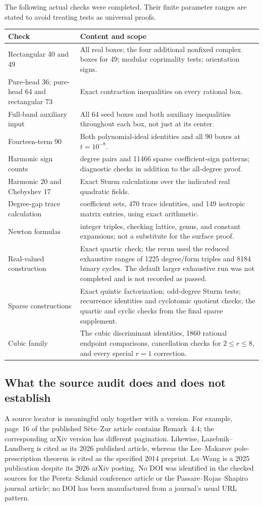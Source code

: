 \documentclass[UTF8,11pt]{ctexart}
\theoremstyle{definition}
\numberwithin{equation}{section}
\begin{document}
The following actual checks were completed. Their finite parameter ranges
are stated to avoid treating tests as universal proofs.
\begin{longtable}{@{}>{\raggedright\arraybackslash}p{}>{\raggedright\arraybackslash}p{}@{}}
\toprule
Check & Content and scope \\
\midrule
\endhead
Rectangular 40 and 49 & All real boxes; the four additional nonfixed complex boxes for 49; modular coprimality tests; orientation signs. \\
Pure-head 36; pure-head 64 and rectangular 73 & Exact contraction inequalities on every rational box. \\
Full-band auxiliary input & All 64 seed boxes and both auxiliary inequalities throughout each box, not just at its center. \\
Fourteen-term 90 & Both polynomial-ideal identities and all 90 boxes at $t=10^{-8}$. \\
Harmonic sign counts & 2016 degree pairs and 11466 sparse coefficient-sign patterns; diagnostic checks in addition to the all-degree proof. \\
Harmonic 20 and Chebyshev 17 & Exact Sturm calculations over the indicated real quadratic fields. \\
Degree-gap trace calculation & 20 coefficient sets, 470 trace identities, and 149 isotropic matrix entries, using exact arithmetic. \\
Newton formulas & 7006 integer triples, checking lattice, genus, and constant expansions; not a substitute for the surface proof. \\
Real-valued construction & Exact quartic check; the rerun used the reduced exhaustive ranges of 1225 degree/form triples and 8184 binary cycles. The default larger exhaustive run was not completed and is not recorded as passed. \\
Sparse constructions & Exact quintic factorization; odd-degree Sturm tests; recurrence identities and cyclotomic quotient checks; the quartic and cyclic checks from the final sparse supplement. \\
Cubic family & The cubic discriminant identities, 1860 rational endpoint comparisons, cancellation checks for $2\le r\le8$, and every special $r=1$ correction. \\
\bottomrule
\end{longtable}

\subsection{What the source audit does and does not establish}
A source locator is meaningful only together with a version. For example,
page~16 of the published S\`ete--Zur article contains Remark~4.4; the
corresponding arXiv version has different pagination. Likewise,
Lazebnik--Lundberg is cited as its 2026 published article, whereas the
Lee--Makarov pole-prescription theorem is cited as the specified 2014
preprint. Lu--Wang is a 2025 publication despite its 2026 arXiv posting.
No DOI was identified in the checked sources for the Peretz--Schmid
conference article or the Passare--Rojas--Shapiro journal article; no DOI
has been manufactured from a journal's usual URL pattern.
\end{document}
